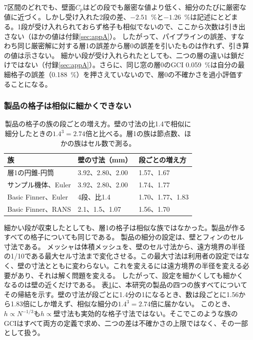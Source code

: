 \documentclass[twocolumn]{labreport}
\newcommand{\Cp}{C_p}
\begin{document}
7区間のどれでも、壁面$\Cp$はどの段でも厳密な値より低く、細分のたびに厳密な値に近づく。しかし受け入れた2段の差、$-2.51$~\%と$-1.26$~\%は記述にとどまる。1段が受け入れられておらず格子も相似でないので、ここから次数は引き出さない（ほかの値は付録\ref{sec:appA}）。
したがって、パイプラインの誤差、すなわち同じ厳密解に対する層1の誤差から層0の誤差を引いたものは作れず、引き算の値は示さない。
細かい段が受け入れられたとしても、二つの層の違いは鎖だけではない（付録\ref{sec:appA}）。さらに、同じ窓の層0のGCI 0.059~\%は自分の最細格子の誤差（0.188~\%）を押さえていないので、層0の不確かさを過小評価することになる。

\subsubsection{製品の格子は相似に細かくできない}
\label{sec:similar}

\begin{table}[t]
\centering
\caption{製品の格子の族の段ごとの増え方。壁の寸法の比1.4で相似に細分したときの$1.4^3=2.74$倍と比べる。層1の族は節点数、ほかの族はセル数で測る。}
\label{tab:growth}
\small
\setlength{\tabcolsep}{3pt}
\begin{tabular}{@{}lll@{}}
\toprule
族 & 壁の寸法（mm） & 段ごとの増え方 \\
\midrule
層1の円錐-円筒 & 3.92、2.80、2.00 & 1.57、1.67 \\
サンプル機体、Euler & 3.92、2.80、2.00 & 1.74、1.77 \\
Basic Finner、Euler & 4段、比1.4 & 1.70、1.77、1.83 \\
Basic Finner、RANS & 2.1、1.5、1.07 & 1.56、1.70 \\
\bottomrule
\end{tabular}
\end{table}

細かい段が収束したとしても、層1の格子は相似な族ではなかった。製品が作るすべての格子についても同じである。
製品の細分の設定は、壁とフィンのセル寸法である。
メッシャは体積メッシュを、壁のセル寸法から、遠方境界の半径の1/10である最大セル寸法まで変化させる。この最大寸法は利用者の設定ではなく、壁の寸法とともに変わらない。これを変えるには遠方境界の半径を変える必要があり、それは解く問題を変える。
したがって、設定を細かくしても細かくなるのは壁の近くだけである。
表\ref{tab:growth}に、本研究の製品の四つの族すべてについてその帰結を示す。壁の寸法が段ごとに1.4分の1になるとき、数は段ごとに1.56から1.83倍にしか増えず、相似な細分の$1.4^3=2.74$倍に届かない。
このとき、$h\propto N^{-1/3}$も$h\propto$壁寸法も実効的な格子寸法ではない。そこでこのような族のGCIはすべて両方の定義で求め、二つの差は不確かさの上限ではなく、その一部として扱う。
\end{document}
